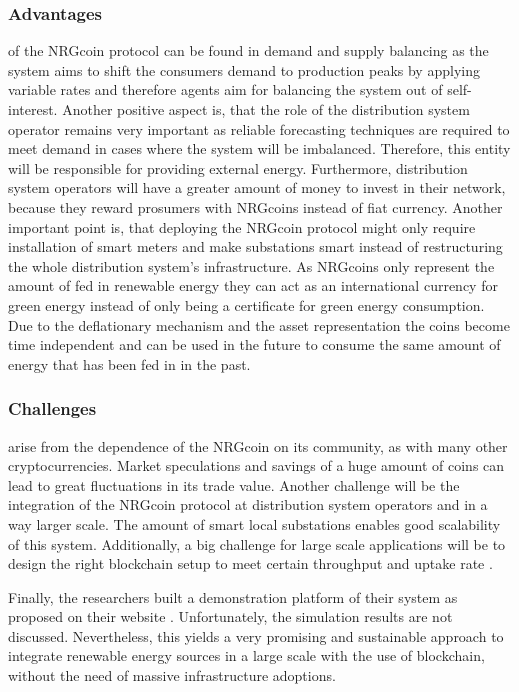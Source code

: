 \documentclass[runningheads]{llncs}
\begin{document}
\subsubsection{Advantages} of the NRGcoin protocol can be found in demand and supply balancing as the system aims to shift the consumers demand to production peaks by applying variable rates and therefore agents aim for balancing the system out of self-interest. \newline
Another positive aspect is, that the role of the distribution system operator remains very important as reliable forecasting techniques are required to meet demand in cases where the system will be imbalanced. Therefore, this entity will be responsible for providing external energy. Furthermore, distribution system operators will have a greater amount of money to invest in their network, because they reward prosumers with NRGcoins instead of fiat currency. Another important point is, that deploying the NRGcoin protocol might only require installation of smart meters and make substations smart instead of restructuring the whole distribution system’s infrastructure. \newline
As NRGcoins only represent the amount of fed in renewable energy they can act as an international currency for green energy instead of only being a certificate for green energy consumption. Due to the deflationary mechanism and the asset representation the coins become time independent and can be used in the future to consume the same amount of energy that has been fed in in the past. \cite{mihaylov_nrgcoin}

\subsubsection{Challenges} arise from the dependence of the NRGcoin on its community, as with many other cryptocurrencies. Market speculations and savings of a huge amount of coins can lead to great fluctuations in its trade value. Another challenge will be the integration of the NRGcoin protocol at distribution system operators and in a way larger scale. The amount of smart local substations enables good scalability of this system. \cite{mihaylov_nrgcoin} \newline
Additionally, a big challenge for large scale applications will be to design the right blockchain setup to meet certain throughput and uptake rate \cite{mihaylov_nrgcoin2}.

Finally, the researchers \cite{mihaylov_nrgcoin} built a demonstration platform of their system as proposed on their website \cite{nrgcoin_demo}. Unfortunately, the simulation results are not discussed. Nevertheless, this yields a very promising and sustainable approach to integrate renewable energy sources in a large scale with the use of blockchain, without the need of massive infrastructure adoptions.
\end{document}
